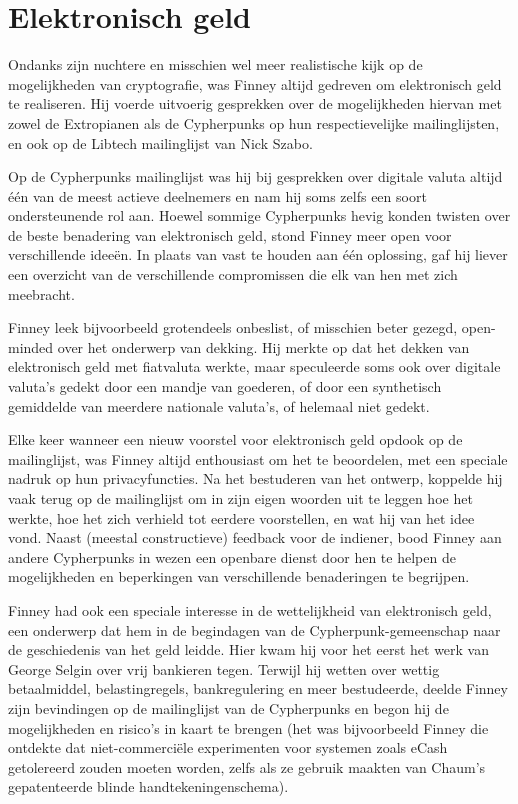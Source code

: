 \documentclass[smalldemyvopaper,11pt,twoside,onecolumn,openright,extrafontsizes,hidelinks]{memoir}
\begin{document}
\section{Elektronisch geld}\label{elektronisch-geld}

Ondanks zijn nuchtere en misschien wel meer realistische kijk op de
mogelijkheden van cryptografie, was Finney altijd gedreven om
elektronisch geld te realiseren. Hij voerde uitvoerig gesprekken over de
mogelijkheden hiervan met zowel de Extropianen als de Cypherpunks op hun
respectievelijke mailinglijsten, en ook op de Libtech mailinglijst van
Nick Szabo.

Op de Cypherpunks mailinglijst was hij bij gesprekken over digitale
valuta altijd één van de meest actieve deelnemers en nam hij soms zelfs
een soort ondersteunende rol aan. Hoewel sommige Cypherpunks hevig
konden twisten over de beste benadering van elektronisch geld, stond
Finney meer open voor verschillende ideeën. In plaats van vast te houden
aan één oplossing, gaf hij liever een overzicht van de verschillende
compromissen die elk van hen met zich meebracht.

Finney leek bijvoorbeeld grotendeels onbeslist, of misschien beter
gezegd, open-minded over het onderwerp van dekking. Hij merkte op dat
het dekken van elektronisch geld met fiatvaluta werkte, maar speculeerde
soms ook over digitale valuta's gedekt door een mandje van goederen, of
door een synthetisch gemiddelde van meerdere nationale valuta's, of
helemaal niet gedekt.

Elke keer wanneer een nieuw voorstel voor elektronisch geld opdook op de
mailinglijst, was Finney altijd enthousiast om het te beoordelen, met
een speciale nadruk op hun privacyfuncties. Na het bestuderen van het
ontwerp, koppelde hij vaak terug op de mailinglijst om in zijn eigen
woorden uit te leggen hoe het werkte, hoe het zich verhield tot eerdere
voorstellen, en wat hij van het idee vond. Naast (meestal constructieve)
feedback voor de indiener, bood Finney aan andere Cypherpunks in wezen
een openbare dienst door hen te helpen de mogelijkheden en beperkingen
van verschillende benaderingen te begrijpen.

Finney had ook een speciale interesse in de wettelijkheid van
elektronisch geld, een onderwerp dat hem in de begindagen van de
Cypherpunk-gemeenschap naar de geschiedenis van het geld leidde. Hier
kwam hij voor het eerst het werk van George Selgin over vrij bankieren
tegen. Terwijl hij wetten over wettig betaalmiddel, belastingregels,
bankregulering en meer bestudeerde, deelde Finney zijn bevindingen op de
mailinglijst van de Cypherpunks en begon hij de mogelijkheden en
risico's in kaart te brengen (het was bijvoorbeeld Finney die ontdekte
dat niet-commerciële experimenten voor systemen zoals eCash getolereerd
zouden moeten worden, zelfs als ze gebruik maakten van Chaum's
gepatenteerde blinde handtekeningenschema).
\end{document}

